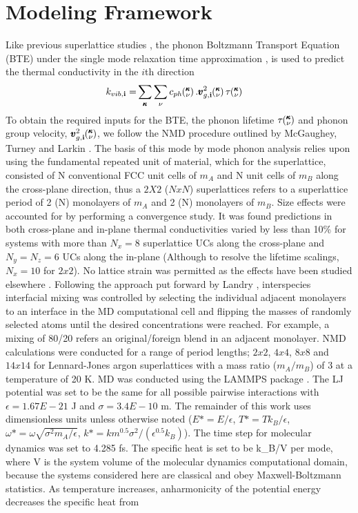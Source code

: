 \documentclass[aps,prb,preprint,preprintnumbers,amsmath,amssymb,floatfix,superscriptaddress]{revtex4}
\newcommand{\kv}{\mspace{-4.0mu}\left(\mspace{-8.0mu}
\begin{smallmatrix}&\pmb{\kappa} \\&\nu\end{smallmatrix}
\mspace{-3.0mu}\right)}
\begin{document}
\section{Modeling Framework}
Like previous superlattice studies \cite{Luckyanova16112012,doi:10.1021/nl202186y}, the phonon Boltzmann Transport Equation (BTE) under the single mode relaxation time approximation \cite{ziman_electrons_2001}, is used to predict the thermal conductivity in the $i$th direction
\begin{equation}\label{EQ:M:conductivity}
\begin{split}
k_{vib,\mathbf{i}}=&\sum_{\pmb{\kappa}} \sum_\nu c_{ph}\kv. 
\pmb{v}^{2}_{g,\mathbf{i}}\kv \tau\kv
\end{split}
\end{equation}
To obtain the required inputs for the BTE, the phonon lifetime $\tau\kv$ and phonon group velocity, $\pmb{v}^{2}_{g,\mathbf{i}}\kv$, we follow the NMD procedure outlined by McGaughey\cite{PhysRevB.71.184305}, Turney \cite {PhysRevB.81.081411} and Larkin \cite{theoretical nanoscience}. The basis of this mode by mode phonon analysis relies upon using the fundamental repeated unit of material, which for the superlattice, consisted of N conventional FCC unit cells of $m_A$ and N unit cells of $m_B$ along the cross-plane direction, thus a $2X2$ ($NxN$) superlattices refers to a superlattice period of 2 (N) monolayers of $m_A$ and 2 (N) monolayers of $m_B$. Size effects were accounted for by performing a convergence study. It was found predictions in both cross-plane and in-plane thermal conductivities varied by less than 10\% for systems with more than $N_x=8$ superlattice UCs along the cross-plane and $N_y=N_z=6$ UCs along the in-plane (Although to resolve the lifetime scalings, $N_x=10$ for $2x2$). No lattice strain was permitted as the effects have been studied elsewhere \cite{PhysRevB.72.174302}. Following the approach put forward by Landry \cite{PhysRevB.79.075316}, interspecies interfacial mixing was controlled by selecting the individual adjacent monolayers to an interface in the MD computational cell and flipping the masses of randomly selected atoms until the desired concentrations were reached. For example, a mixing of 80/20 refers an original/foreign blend in an adjacent monolayer. NMD calculations were conducted for a range of period lengths; $2x2$, $4x4$, $8x8$ and $14x14$ for Lennard-Jones argon superlattices with a mass ratio ($m_A/m_B$) of 3 at a temperature of 20 K. MD was conducted using the LAMMPS package \cite{LAMMPS}. The LJ potential was set to be the same for all possible pairwise interactions with $\epsilon= 1.67E-21$ J and $\sigma= 3.4E-10$ m. The remainder of this work uses dimensionless units unless otherwise noted ($E*=E/\epsilon$, $T*=Tk_B/\epsilon$, $\omega*=\omega\sqrt{\sigma^2m_A/\epsilon}$, $k*=km^{0.5}\sigma^2/(\epsilon^{0.5}k_B)$). The time step for molecular dynamics was set to 4.285 fs. The specific heat is set to be k_B/V per mode, where V is the system volume of the molecular dynamics computational domain, because the systems considered here are classical and obey Maxwell-Boltzmann statistics. As temperature increases, anharmonicity of the potential energy decreases the specific heat from 
\end{document}
